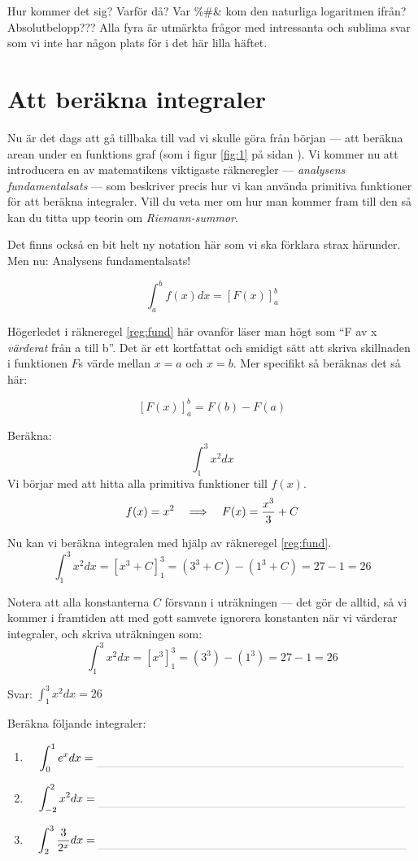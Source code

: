 \documentclass[a4paper, 12pt]{article}
\begin{document}
Hur kommer det sig? Varför då? Var \%\#\& kom den naturliga logaritmen ifrån? Absolutbelopp??? Alla fyra är utmärkta frågor med intressanta och sublima svar som vi inte har någon plats för i det här lilla häftet.

\section{Att beräkna integraler}

Nu är det dags att gå tillbaka till vad vi skulle göra från början --- att beräkna arean under en funktions graf (som i figur \ref{fig:1} på sidan \pageref{fig:1}). Vi kommer nu att introducera en av matematikens viktigaste räkneregler --- \emph{analysens fundamentalsats} --- som beskriver precis hur vi kan använda primitiva funktioner för att beräkna integraler. Vill du veta mer om hur man kommer fram till den så kan du titta upp teorin om \emph{Riemann-summor}.

Det finns också en bit helt ny notation här som vi ska förklara strax härunder. Men nu: Analysens fundamentalsats!
\begin{regel}
    \label{reg:fund}
    \[\int_{a}^{b}f(x)dx = \left[F(x)\right]_a^b\]
\end{regel}

Högerledet i räkneregel \ref{reg:fund} här ovanför läser man högt som ``F av x \emph{värderat} från a till b''. Det är ett kortfattat och smidigt sätt att skriva skillnaden i funktionen $F$s värde mellan $x=a$ och $x=b$. Mer specifikt så beräknas det så här:


\begin{regel}
    \label{reg:val}
    \[\left[F(x)\right]_a^b = F(b) - F(a)\]
\end{regel}

\begin{exempel}
    Beräkna: \[\int_1^3x^2dx\]
    \dinkus
    Vi börjar med att hitta alla primitiva funktioner till $f(x)$.
    \[f(x) = x^2 \hspace{1em} \Longrightarrow \hspace{1em} F(x) = \dfrac {x^3}3 + C\]

    Nu kan vi beräkna integralen med hjälp av räkneregel \ref{reg:fund}.
    \[\int_1^3x^2dx = \left[x^3 + C\right]_1^3 = \left(3^3 + C \right) - \left(1^3 + C\right) = 27 - 1 = 26\]

    Notera att alla konstanterna $C$ försvann i uträkningen --- det gör de alltid, så vi kommer i framtiden att med gott samvete ignorera konstanten när vi värderar integraler, och skriva uträkningen som:
    \[\int_1^3x^2dx = \left[x^3\right]_1^3 = \left(3^3\right) - \left(1^3\right) = 27 - 1 = 26\]

    Svar: $\int_1^3x^2dx = 26$
\end{exempel}

\begin{uppgifter}
    \label{upp:int}
    Beräkna följande integraler:
    \begin{enumerate}
        \item \[\int_0^1e^xdx \ans[27] \]
        \item \[\int_{-2}^2x^2dx \ans[27]\]
        \item \[\int_2^3\dfrac 3{2^x}dx \ans[27]\]
    \end{enumerate}
\end{uppgifter}
\end{document}

